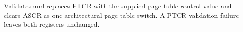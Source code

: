 Validates and replaces PTCR with the supplied page-table control value and clears ASCR as one architectural page-table switch. A PTCR validation failure leaves both registers unchanged.
